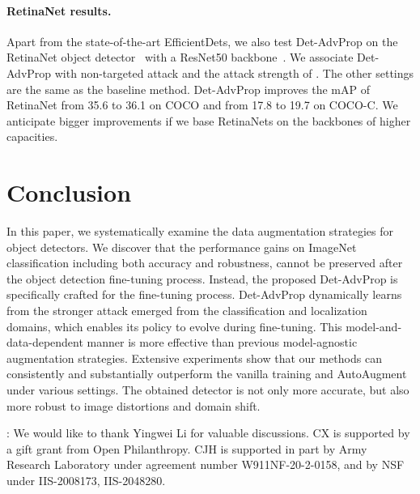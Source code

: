 \documentclass[final]{cvpr}
\begin{document}
\vspace{-4pt}
\paragraph{RetinaNet results.}
Apart from the state-of-the-art EfficientDets, we also test Det-AdvProp on the RetinaNet object detector~\cite{lin2017focal} with a ResNet50 backbone~\cite{he2016resnet}. 
We associate Det-AdvProp with non-targeted attack and the attack strength of . 
The other settings are the same as the baseline method.
Det-AdvProp improves the mAP of RetinaNet from 35.6 to 36.1 on COCO and from 17.8 to 19.7 on COCO-C.
We anticipate bigger improvements if we base RetinaNets on the backbones of higher capacities. 

\vspace{-4pt}
\section{Conclusion}
In this paper, we systematically examine the data augmentation strategies for object detectors.
We discover that the performance gains on ImageNet classification including both accuracy and robustness, cannot be preserved after the object detection fine-tuning process.
Instead, the proposed Det-AdvProp is specifically crafted for the fine-tuning process.
Det-AdvProp dynamically learns from the stronger attack emerged from the classification and localization domains, which enables its policy to evolve during fine-tuning.
This model-and-data-dependent manner is more effective than previous model-agnostic augmentation strategies.
Extensive experiments show that our methods can consistently and substantially outperform the vanilla training and AutoAugment under various settings.
The obtained detector is not only more accurate, but also more robust to image distortions and domain shift.

{\footnotesize
{: We would like to thank Yingwei Li for valuable discussions. CX is supported by a gift grant from Open Philanthropy. CJH is supported in part by Army Research Laboratory under agreement number 	
W911NF-20-2-0158, and by NSF under  IIS-2008173, IIS-2048280. }
}







{\small


}

\clearpage
\end{document}
